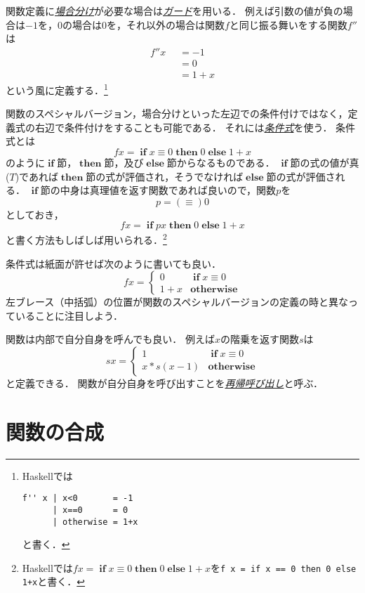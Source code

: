 \documentclass[twocolumn]{jsbook}
\newcommand{\keyword}[1]{\underline{\emph{#1}}}
\newcommand{\code}[1]{\texttt{#1}}
\newcommand{\mathKeyword}[1]{\mathbf{#1}}
\DeclareMathOperator{\mathElse}{\mathKeyword{else}}
\DeclareMathOperator{\mathIf}{\mathKeyword{if}}
\DeclareMathOperator{\mathThen}{\mathKeyword{then}}
\newcommand{\mathOtherwise}{\mathKeyword{otherwise}}
\newcommand{\mathGuard}[1]{\mathop{\mid_{#1}}}
\begin{document}
関数定義に\keyword{場合分け}が必要な場合は\keyword{ガード}を用いる．
例えば引数の値が負の場合は$-1$を，$0$の場合は$0$を，それ以外の場合は関数$f$と同じ振る舞いをする関数$f''$は
\begin{equation*}
\begin{split}
f''x&\mathGuard{x<0}=-1\\
&\mathGuard{x\equiv 0}=0\\
&\mathGuard{\mathOtherwise}=1+x
\end{split}
\end{equation*}
という風に定義する．\footnote{Haskellでは
\begin{Verbatim}[xleftmargin=10mm]
f'' x | x<0       = -1
      | x==0      = 0
      | otherwise = 1+x
\end{Verbatim}
と書く．}

関数のスペシャルバージョン，場合分けといった左辺での条件付けではなく，定義式の右辺で条件付けをすることも可能である．
それには\keyword{条件式}を使う．
条件式とは
$$fx=\mathIf x\equiv0\mathThen0\mathElse1+x$$
のように$\mathIf$節，$\mathThen$節，及び$\mathElse$節からなるものである．
$\mathIf$節の式の値が真($T$)であれば$\mathThen$節の式が評価され，そうでなければ$\mathElse$節の式が評価される．
$\mathIf$節の中身は真理値を返す関数であれば良いので，関数$p$を$$p=(\equiv)0$$としておき，$$fx=\mathIf px\mathThen0\mathElse1+x$$と書く方法もしばしば用いられる．\footnote{Haskellでは$fx=\mathIf x\equiv0\mathThen0\mathElse1+x$を\code{f x = if x == 0 then 0 else 1+x}と書く．}

条件式は紙面が許せば次のように書いても良い．
\begin{equation*}
fx=\begin{cases}
0&\mathIf x\equiv0\\
1+x&\mathOtherwise
\end{cases}
\end{equation*}
左ブレース（中括弧）の位置が関数のスペシャルバージョンの定義の時と異なっていることに注目しよう．

関数は内部で自分自身を呼んでも良い．
例えば$x$の階乗を返す関数$s$は
\begin{equation*}
sx=\begin{cases}
1&\mathIf x\equiv0\\
x*s(x-1)&\mathOtherwise
\end{cases}
\end{equation*}
と定義できる．
関数が自分自身を呼び出すことを\keyword{再帰呼び出し}と呼ぶ．

\section{関数の合成}
\end{document}
